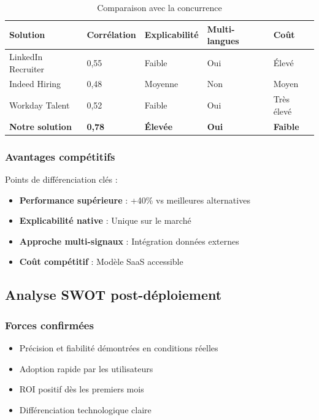 \documentclass[12pt,a4paper]{report}
\begin{document}
\begin{table}[H]
\centering
\caption{Comparaison avec la concurrence}
\label{tab:concurrence}
\begin{tabular}{@{}lllll@{}}
\toprule
Solution & Corrélation & Explicabilité & Multi-langues & Coût \\
\midrule
LinkedIn Recruiter & 0,55 & Faible & Oui & Élevé \\
Indeed Hiring & 0,48 & Moyenne & Non & Moyen \\
Workday Talent & 0,52 & Faible & Oui & Très élevé \\
\textbf{Notre solution} & \textbf{0,78} & \textbf{Élevée} & \textbf{Oui} & \textbf{Faible} \\
\bottomrule
\end{tabular}
\end{table}

\subsubsection{Avantages compétitifs}

Points de différenciation clés :
\begin{itemize}
\item \textbf{Performance supérieure} : +40\% vs meilleures alternatives
\item \textbf{Explicabilité native} : Unique sur le marché
\item \textbf{Approche multi-signaux} : Intégration données externes
\item \textbf{Coût compétitif} : Modèle SaaS accessible
\end{itemize}

\subsection{Analyse SWOT post-déploiement}

\subsubsection{Forces confirmées}

\begin{itemize}
\item Précision et fiabilité démontrées en conditions réelles
\item Adoption rapide par les utilisateurs
\item ROI positif dès les premiers mois
\item Différenciation technologique claire
\end{itemize}
\end{document}
